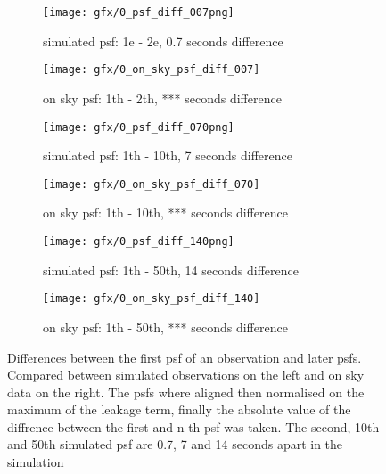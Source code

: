 \begin{figure}[h!]
  
      \begin{subfigure}[b]{0.5\textwidth}
        \texttt{[image: gfx/0\_psf\_diff\_007png]}
        \caption{simulated psf: 1e - 2e, 0.7 seconds difference}
      \end{subfigure}%
      \begin{subfigure}[b]{0.5\textwidth}
        \texttt{[image: gfx/0\_on\_sky\_psf\_diff\_007]}
        \caption{on sky psf: 1th - 2th, *** seconds difference}
      \end{subfigure}      
      
      \begin{subfigure}[b]{0.5\textwidth}
        \texttt{[image: gfx/0\_psf\_diff\_070png]}
        \caption{simulated psf: 1th - 10th, 7 seconds difference}
      \end{subfigure}%
      \begin{subfigure}[b]{0.5\textwidth}
        \texttt{[image: gfx/0\_on\_sky\_psf\_diff\_070]}
        \caption{on sky psf: 1th - 10th, *** seconds difference}
      \end{subfigure}
            
      \begin{subfigure}[b]{0.5\textwidth}
        \texttt{[image: gfx/0\_psf\_diff\_140png]}
        \caption{simulated psf: 1th - 50th, 14 seconds difference}
      \end{subfigure}%
      \begin{subfigure}[b]{0.5\textwidth}
        \texttt{[image: gfx/0\_on\_sky\_psf\_diff\_140]}
        \caption{on sky psf: 1th - 50th, *** seconds difference}
      \end{subfigure}


  \caption{Differences between the first psf of an observation and later psfs. Compared between simulated observations on the left and on sky data on the right. The psfs where aligned then normalised on the maximum of the leakage term, finally the absolute value of the diffrence between the first and n-th psf was taken. The second, 10th and 50th simulated psf are 0.7, 7 and 14 seconds apart in the simulation}
  \label{fig:psfs_evolving}
\end{figure}

